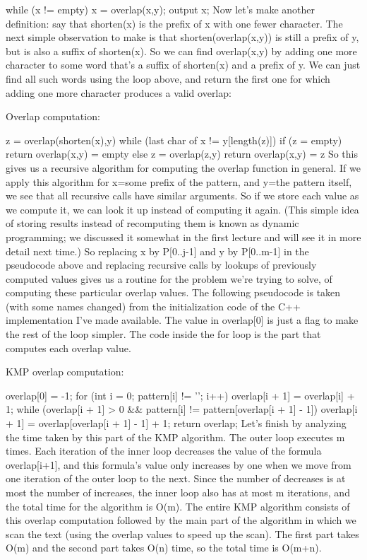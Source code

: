     while (x != empty) {
    x = overlap(x,y);
    output x;
    }
Now let's make another definition: say that shorten(x) is the prefix of x with one fewer character. The next simple observation to make is that shorten(overlap(x,y)) is still a prefix of y, but is also a suffix of shorten(x). So we can find overlap(x,y) by adding one more character to some word that's a suffix of shorten(x) and a prefix of y. We can just find all such words using the loop above, and return the first one for which adding one more character produces a valid overlap:

Overlap computation:

    z = overlap(shorten(x),y)
    while (last char of x != y[length(z)])
    {
    if (z = empty) return overlap(x,y) = empty
    else z = overlap(z,y)
    }
    return overlap(x,y) = z
So this gives us a recursive algorithm for computing the overlap function in general. If we apply this algorithm for x=some prefix of the pattern, and y=the pattern itself, we see that all recursive calls have similar arguments. So if we store each value as we compute it, we can look it up instead of computing it again. (This simple idea of storing results instead of recomputing them is known as dynamic programming; we discussed it somewhat in the first lecture and will see it in more detail next time.) So replacing x by P[0..j-1] and y by P[0..m-1] in the pseudocode above and replacing recursive calls by lookups of previously computed values gives us a routine for the problem we're trying to solve, of computing these particular overlap values. The following pseudocode is taken (with some names changed) from the initialization code of the C++ implementation I've made available. The value in overlap[0] is just a flag to make the rest of the loop simpler. The code inside the for loop is the part that computes each overlap value.

KMP overlap computation:

    overlap[0] = -1;
    for (int i = 0; pattern[i] != '\0'; i++) {
    overlap[i + 1] = overlap[i] + 1;
    while (overlap[i + 1] > 0 &&
           pattern[i] != pattern[overlap[i + 1] - 1])
        overlap[i + 1] = overlap[overlap[i + 1] - 1] + 1;
    }
    return overlap;
Let's finish by analyzing the time taken by this part of the KMP algorithm. The outer loop executes m times. Each iteration of the inner loop decreases the value of the formula overlap[i+1], and this formula's value only increases by one when we move from one iteration of the outer loop to the next. Since the number of decreases is at most the number of increases, the inner loop also has at most m iterations, and the total time for the algorithm is O(m). The entire KMP algorithm consists of this overlap computation followed by the main part of the algorithm in which we scan the text (using the overlap values to speed up the scan). The first part takes O(m) and the second part takes O(n) time, so the total time is O(m+n).